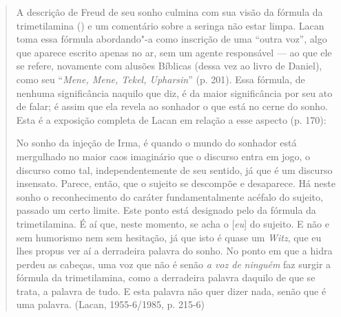 \begin{quote}
A descrição de Freud de seu sonho culmina com sua visão da fórmula da
trimetilamina () e um comentário sobre a seringa não estar
limpa. Lacan toma essa fórmula abordando"-a como inscrição de uma ``outra
voz'', algo que aparece escrito apenas no ar, sem um agente responsável
--- ao que ele se refere, novamente com alusões Bíblicas (dessa vez ao
livro de Daniel), como seu ``\emph{Mene, Mene, Tekel, Upharsin}'' (p.
201). Essa fórmula, de nenhuma significância naquilo que diz, é da maior
significância por seu ato de falar; é assim que ela revela ao sonhador o
que está no cerne do sonho. Esta é a exposição completa de Lacan em
relação a esse aspecto (p. 170):

No sonho da injeção de Irma, é quando o mundo do sonhador está
mergulhado no maior caos imaginário que o discurso entra em jogo, o
discurso como tal, independentemente de seu sentido, já que é um
discurso insensato. Parece, então, que o sujeito se descompõe e
desaparece. Há neste sonho o reconhecimento do caráter fundamentalmente
acéfalo do sujeito, passado um certo limite. Este ponto está designado
pelo \emph{} da fórmula da trimetilamina. É aí que, neste momento, se
acha o {[}\emph{eu}{]} do sujeito. E não e sem humorismo nem sem
hesitação, já que isto é quase um \emph{Witz}, que eu lhes propus ver aí
a derradeira palavra do sonho. No ponto em que a hidra perdeu as
cabeças, uma voz que não é senão \emph{a voz de} \emph{ninguém} faz
surgir a fórmula da trimetilamina, como a derradeira palavra daquilo de
que se trata, a palavra de tudo. E esta palavra não quer dizer nada,
senão que é uma palavra. (Lacan, 1955-6/1985, p. 215-6)
\end{quote}

